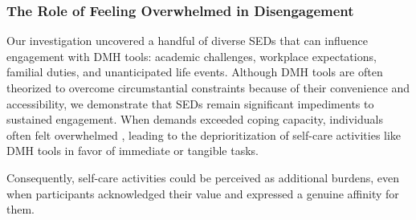 \subsubsection{The Role of Feeling Overwhelmed in Disengagement}
Our investigation uncovered a handful of diverse SEDs that can influence engagement with DMH tools: academic challenges, workplace expectations, familial duties, and unanticipated life events. Although DMH tools are often theorized to overcome circumstantial constraints because of their convenience and accessibility, we demonstrate that SEDs remain significant impediments to sustained engagement.  When demands exceeded coping capacity, individuals often felt overwhelmed \cite{kabigting2019conceptual, hopps1995power}, leading to the deprioritization of self-care activities like DMH tools in favor of immediate or tangible tasks.


 Consequently, self-care activities could be perceived as additional burdens, even when participants acknowledged their value and expressed a genuine affinity for them.



